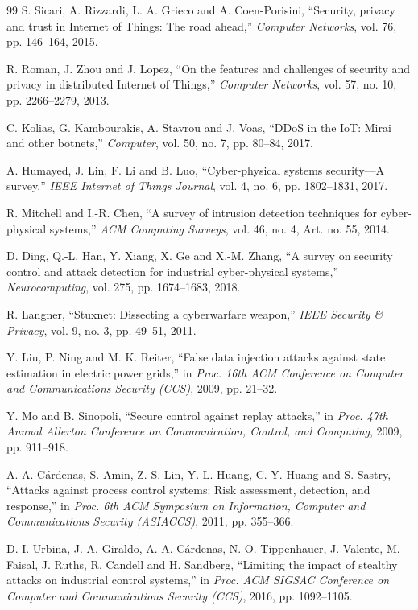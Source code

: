 \begin{thebibliography}{99}
 S. Sicari, A. Rizzardi, L. A. Grieco and A. Coen-Porisini, ``Security, privacy and trust in Internet of Things: The road ahead,'' \emph{Computer Networks}, vol. 76, pp. 146--164, 2015.

 R. Roman, J. Zhou and J. Lopez, ``On the features and challenges of security and privacy in distributed Internet of Things,'' \emph{Computer Networks}, vol. 57, no. 10, pp. 2266--2279, 2013.

 C. Kolias, G. Kambourakis, A. Stavrou and J. Voas, ``DDoS in the IoT: Mirai and other botnets,'' \emph{Computer}, vol. 50, no. 7, pp. 80--84, 2017.

 A. Humayed, J. Lin, F. Li and B. Luo, ``Cyber-physical systems security---A survey,'' \emph{IEEE Internet of Things Journal}, vol. 4, no. 6, pp. 1802--1831, 2017.

 R. Mitchell and I.-R. Chen, ``A survey of intrusion detection techniques for cyber-physical systems,'' \emph{ACM Computing Surveys}, vol. 46, no. 4, Art. no. 55, 2014.

 D. Ding, Q.-L. Han, Y. Xiang, X. Ge and X.-M. Zhang, ``A survey on security control and attack detection for industrial cyber-physical systems,'' \emph{Neurocomputing}, vol. 275, pp. 1674--1683, 2018.

 R. Langner, ``Stuxnet: Dissecting a cyberwarfare weapon,'' \emph{IEEE Security \& Privacy}, vol. 9, no. 3, pp. 49--51, 2011.

 Y. Liu, P. Ning and M. K. Reiter, ``False data injection attacks against state estimation in electric power grids,'' in \emph{Proc. 16th ACM Conference on Computer and Communications Security (CCS)}, 2009, pp. 21--32.

 Y. Mo and B. Sinopoli, ``Secure control against replay attacks,'' in \emph{Proc. 47th Annual Allerton Conference on Communication, Control, and Computing}, 2009, pp. 911--918.

 A. A. C\'ardenas, S. Amin, Z.-S. Lin, Y.-L. Huang, C.-Y. Huang and S. Sastry, ``Attacks against process control systems: Risk assessment, detection, and response,'' in \emph{Proc. 6th ACM Symposium on Information, Computer and Communications Security (ASIACCS)}, 2011, pp. 355--366.

 D. I. Urbina, J. A. Giraldo, A. A. C\'ardenas, N. O. Tippenhauer, J. Valente, M. Faisal, J. Ruths, R. Candell and H. Sandberg, ``Limiting the impact of stealthy attacks on industrial control systems,'' in \emph{Proc. ACM SIGSAC Conference on Computer and Communications Security (CCS)}, 2016, pp. 1092--1105.


\end{thebibliography}
